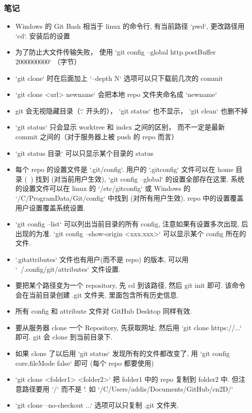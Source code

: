 \subsubsection{笔记}
\begin{itemize}
\item Windows 的 Git Bash 相当于 linux 的命令行, 有当前路径 `pwd`, 更改路径用 `cd`.
安装后的设置
\item 为了防止大文件传输失败， 使用 `git config --global http.postBuffer 2000000000` （字节）
\item `git clone` 时在后面加上 `--depth N` 选项可以只下载前几次的 commit
\item `git clone <url> newname` 会把本地 repo 文件夹命名成 `newname`
\item git 会无视隐藏目录（`.` 开头的）， `git status` 也不显示， `git clean` 也删不掉
\item `git status` 只会显示 worktree 和 index 之间的区别， 而不一定是最新 commit 之间的（对于服务器上被 push 的 repo 而言）
\item `git status 目录` 可以只显示某个目录的 status
\item 每个 repo 的设置文件是 `.git/config`. 用户的 `.gitconfig` 文件可以在 home 目录 (~) 找到 (对当前用户生效), `git config --global` 的设置全部存在这里. 系统的设置文件可以在 linux 的 `/etc/gitconfig` 或 Windows 的 `/C/ProgramData/Git/config` 中找到 (对所有用户生效). repo 中的设置覆盖用户设置覆盖系统设置.
\item `git config --list` 可以列出当前目录的所有 config, 注意如果有设置多次出现, 后出现的为准. `git config --show-origin <xxx.xxx>` 可以显示某个 config 所在的文件.
\item `.gitattributes` 文件也有用户(而不是 repo) 的版本, 可以用 `~/.config/git/attributes` 文件设置.
\item 要把某个路径变为一个 repository, 先 cd 到该路径, 然后 git init 即可. 该命令会在当前目录创建 .git 文件夹, 里面包含所有历史信息.
\item 所有 config 和 attribute 文件对 GitHub Desktop 同样有效.
\item 要从服务器 clone 一个 Repository, 先获取网址, 然后用 `git clone https://...` 即可. git 会 clone 到当前目录下.
\item 如果 clone 了以后用 `git status` 发现所有的文件都改变了, 用 `git config core.fileMode false` 即可 (每个 repo 都要使用)
\item `git clone <folder1> <folder2>` 把 folder1 中的 repo 复制到 folder2 中. 但注意路径要用 `/` 而不是 `\`. 如 `/C/Users/addis/Documents/GitHub/cn2D/`
\item `git clone --no-checkout ...` 选项可以只复制 .git 文件夹.

\end{itemize}
